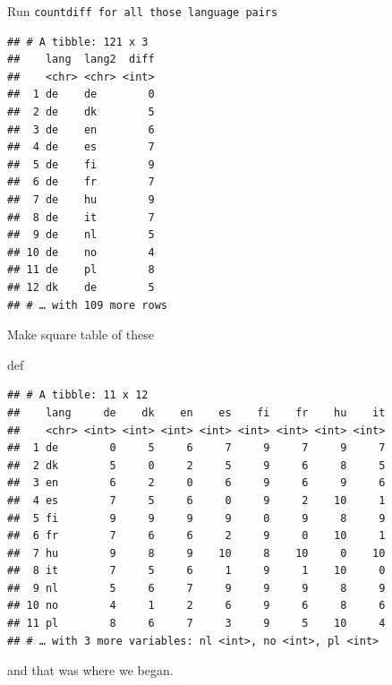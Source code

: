 \documentclass[ignorenonframetext,]{beamer}
\newenvironment{Shaded}{\begin{snugshade}}{\end{snugshade}}
\newcommand{\DataTypeTok}[1]{\textcolor[rgb]{0.13,0.29,0.53}{#1}}
\newcommand{\DecValTok}[1]{\textcolor[rgb]{0.00,0.00,0.81}{#1}}
\newcommand{\KeywordTok}[1]{\textcolor[rgb]{0.13,0.29,0.53}{\textbf{#1}}}
\newcommand{\NormalTok}[1]{#1}
\newcommand{\OperatorTok}[1]{\textcolor[rgb]{0.81,0.36,0.00}{\textbf{#1}}}
\newcommand{\StringTok}[1]{\textcolor[rgb]{0.31,0.60,0.02}{#1}}
\begin{document}
\begin{frame}[fragile]{Run
\texttt{countdiff\ for\ all\ those\ language\ pairs}}
\protect\hypertarget{run-countdiff-for-all-those-language-pairs}{}

\begin{Shaded}
\end{Shaded}

\begin{verbatim}
## # A tibble: 121 x 3
##    lang  lang2  diff
##    <chr> <chr> <int>
##  1 de    de        0
##  2 de    dk        5
##  3 de    en        6
##  4 de    es        7
##  5 de    fi        9
##  6 de    fr        7
##  7 de    hu        9
##  8 de    it        7
##  9 de    nl        5
## 10 de    no        4
## 11 de    pl        8
## 12 dk    de        5
## # … with 109 more rows
\end{verbatim}

\end{frame}

\begin{frame}[fragile]{Make square table of these}
\protect\hypertarget{make-square-table-of-these}{}

def

\begin{Shaded}
\end{Shaded}

\begin{verbatim}
## # A tibble: 11 x 12
##    lang     de    dk    en    es    fi    fr    hu    it
##    <chr> <int> <int> <int> <int> <int> <int> <int> <int>
##  1 de        0     5     6     7     9     7     9     7
##  2 dk        5     0     2     5     9     6     8     5
##  3 en        6     2     0     6     9     6     9     6
##  4 es        7     5     6     0     9     2    10     1
##  5 fi        9     9     9     9     0     9     8     9
##  6 fr        7     6     6     2     9     0    10     1
##  7 hu        9     8     9    10     8    10     0    10
##  8 it        7     5     6     1     9     1    10     0
##  9 nl        5     6     7     9     9     9     8     9
## 10 no        4     1     2     6     9     6     8     6
## 11 pl        8     6     7     3     9     5    10     4
## # … with 3 more variables: nl <int>, no <int>, pl <int>
\end{verbatim}

and that was where we began.

\end{frame}
\end{document}

